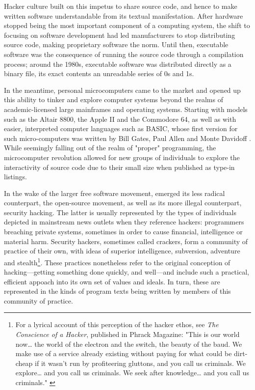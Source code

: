 Hacker culture built on this impetus to share source code, and hence to make written software understandable from its textual manifestation. After hardware stopped being the most important component of a computing system, the shift to focusing on software development had led manufacturers to stop distributing source code, making proprietary software the norm. Until then, executable software was the consequence of running the source code through a compilation process; around the 1980s, executable software was distributed directly as a binary file, its exact contents an unreadable series of 0s and 1s.

In the meantime, personal microcomputers came to the market and opened up this ability to tinker and explore computer systems beyond the realms of academic-licensed large mainframes and operating systems. Starting with models such as the Altair 8800, the Apple II and the Commodore 64, as well as with easier, interpreted computer languages such as BASIC, whose first version for such micro-computers was written by Bill Gates, Paul Allen and Monte Davidoff \citep{montfort_10_2014}. While seemingly falling out of the realm of "proper" programming, the microcomputer revolution allowed for new groups of individuals to explore the interactivity of source code due to their small size when published as type-in listings.

In the wake of the larger free software movement, emerged its less radical counterpart, the open-source movement, as well as its more illegal counterpart, security hacking. The latter is usually represented by the types of individuals depicted in mainstream news outlets when they reference hackers: programmers breaching private systems, sometimes in order to cause financial, intelligence or material harm. Security hackers, sometimes called crackers, form a community of practice of their own, with ideas of superior intelligence, subversion, adventure and stealth\footnote{For a lyrical account of this perception of the hacker ethos, see \emph{The Conscience of a Hacker}, published in Phrack Magazine: "This is our world now\dots{} the world of the electron and the switch, the beauty of the baud.  We make use of a service already existing without paying for what could be dirt-cheap if it wasn't run by profiteering gluttons, and you call us criminals.  We explore\dots{} and you call us criminals.  We seek after knowledge\dots{} and you call us criminals." \citep{mentor+++_conscience_1986}}. These practices nonetheless refer to the original conception of hacking—getting something done quickly, and well—and include such a practical, efficient appoach into its own set of values and ideals. In turn, these are represented in the kinds of program texts being written by members of this community of practice.

